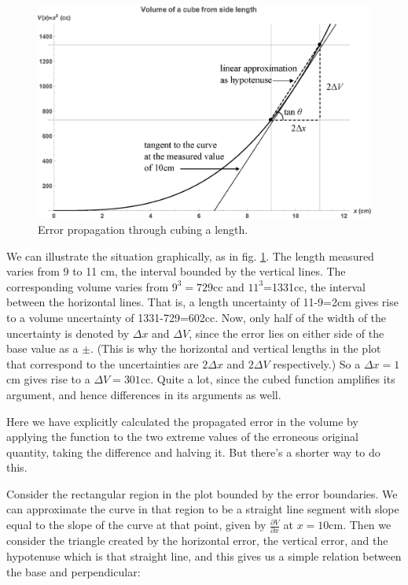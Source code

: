 \begin{figure}[!htb]
\centering
\epsfxsize=12cm \includegraphics[scale=0.5]{0_intro/cubing.eps}
\caption{Error propagation through cubing a length.}
\label{fig:intro:cubing}
\end{figure}

We can illustrate the situation graphically, as in fig. \ref{fig:intro:cubing}.
The length measured varies from 9 to 11 cm, the interval bounded by
the vertical lines. The corresponding volume varies from $9^{3}=729$cc
and $11^{3}$=1331cc, the interval between the horizontal lines. That
is, a length uncertainty of 11-9=2cm gives rise to a volume uncertainty
of 1331-729=602cc. Now, only half of the width of the uncertainty
is denoted by $\Delta x$ and $\Delta V$, since the error lies on
either side of the base value as a $\pm$. (This is why the horizontal
and vertical lengths in the plot that correspond to the uncertainties
are $2\Delta x$ and $2\Delta V$ respectively.) So a $\Delta x=1$cm
gives rise to a $\Delta V=301$cc. Quite a lot, since the cubed function
amplifies its argument, and hence differences in its arguments as
well.

Here we have explicitly calculated the propagated error in the volume
by applying the function to the two extreme values of the erroneous
original quantity, taking the difference and halving it. But there's
a shorter way to do this.

Consider the rectangular region in the plot bounded by the error boundaries.
We can approximate the curve in that region to be a straight line
segment with slope equal to the slope of the curve at that point,
given by $\frac{\partial V}{\partial x}$ at $x=10$cm. Then we consider
the triangle created by the horizontal error, the vertical error,
and the hypotenuse which is that straight line, and this gives us
a simple relation between the base and perpendicular:

